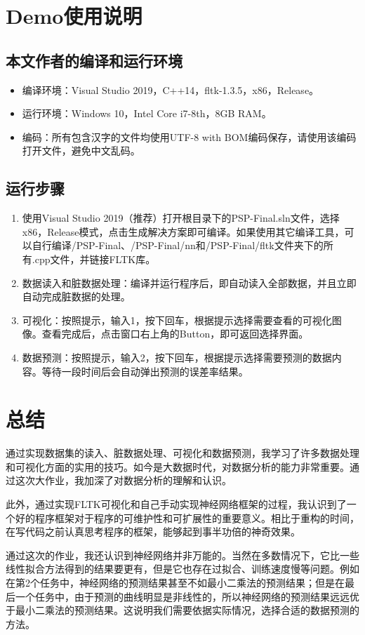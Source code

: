 \documentclass[CJK]{ctexart}
\begin{document}
\section{Demo使用说明}
\subsection{本文作者的编译和运行环境}
\begin{itemize}
    \item 编译环境：Visual Studio 2019，C++14，fltk-1.3.5，x86，Release。
    \item 运行环境：Windows 10，Intel Core i7-8th，8GB RAM。
    \item 编码：所有包含汉字的文件均使用UTF-8 with BOM编码保存，请使用该编码打开文件，避免中文乱码。
\end{itemize}
\subsection{运行步骤}
\begin{enumerate}
    \item 使用Visual Studio 2019（推荐）打开根目录下的PSP-Final.sln文件，选择x86，Release模式，点击生成解决方案即可编译。如果使用其它编译工具，可以自行编译/PSP-Final、/PSP-Final/nn和/PSP-Final/fltk文件夹下的所有.cpp文件，并链接FLTK库。
    \item 数据读入和脏数据处理：编译并运行程序后，即自动读入全部数据，并且立即自动完成脏数据的处理。
    \item 可视化：按照提示，输入1，按下回车，根据提示选择需要查看的可视化图像。查看完成后，点击窗口右上角的Button，即可返回选择界面。
    \item 数据预测：按照提示，输入2，按下回车，根据提示选择需要预测的数据内容。等待一段时间后会自动弹出预测的误差率结果。
\end{enumerate}


\section{总结}
通过实现数据集的读入、脏数据处理、可视化和数据预测，我学习了许多数据处理和可视化方面的实用的技巧。如今是大数据时代，对数据分析的能力非常重要。通过这次大作业，我加深了对数据分析的理解和认识。\par
此外，通过实现FLTK可视化和自己手动实现神经网络框架的过程，我认识到了一个好的程序框架对于程序的可维护性和可扩展性的重要意义。相比于重构的时间，在写代码之前认真思考程序的框架，能够起到事半功倍的神奇效果。\par
通过这次的作业，我还认识到神经网络并非万能的。当然在多数情况下，它比一些线性拟合方法得到的结果要更有，但是它也存在过拟合、训练速度慢等问题。例如在第2个任务中，神经网络的预测结果甚至不如最小二乘法的预测结果；但是在最后一个任务中，由于预测的曲线明显是非线性的，所以神经网络的预测结果远远优于最小二乘法的预测结果。这说明我们需要依据实际情况，选择合适的数据预测的方法。
\end{document}
